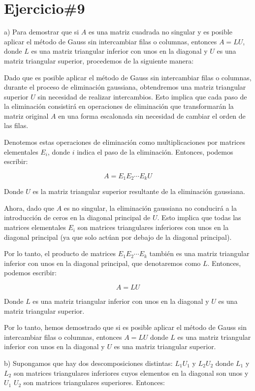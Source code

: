 \documentclass[a4paper,12pt]{article}
\begin{document}
\section*{Ejercicio\#9}

a)
Para demostrar que si \( A \) es una matriz cuadrada no singular y es posible aplicar el método de Gauss sin intercambiar filas o columnas, entonces \( A = LU \), donde \( L \) es una matriz triangular inferior con unos en la diagonal y \( U \) es una matriz triangular superior, procedemos de la siguiente manera:

Dado que es posible aplicar el método de Gauss sin intercambiar filas o columnas, durante el proceso de eliminación gaussiana, obtendremos una matriz triangular superior \( U \) sin necesidad de realizar intercambios. Esto implica que cada paso de la eliminación consistirá en operaciones de eliminación que transformarán la matriz original \( A \) en una forma escalonada sin necesidad de cambiar el orden de las filas.

Denotemos estas operaciones de eliminación como multiplicaciones por matrices elementales \( E_i \), donde \( i \) indica el paso de la eliminación. Entonces, podemos escribir:

\[ A = E_1 E_2 \cdots E_k U \]

Donde \( U \) es la matriz triangular superior resultante de la eliminación gaussiana.

Ahora, dado que \( A \) es no singular, la eliminación gaussiana no conducirá a la introducción de ceros en la diagonal principal de \( U \). Esto implica que todas las matrices elementales \( E_i \) son matrices triangulares inferiores con unos en la diagonal principal (ya que solo actúan por debajo de la diagonal principal).

Por lo tanto, el producto de matrices \( E_1 E_2 \cdots E_k \) también es una matriz triangular inferior con unos en la diagonal principal, que denotaremos como \( L \). Entonces, podemos escribir:

\[ A = L U \]

Donde \( L \) es una matriz triangular inferior con unos en la diagonal y \( U \) es una matriz triangular superior.

Por lo tanto, hemos demostrado que si es posible aplicar el método de Gauss sin intercambiar filas o columnas, entonces \( A = LU \) donde \( L \) es una matriz triangular inferior con unos en la diagonal y \( U \) es una matriz triangular superior.

b) Supongamos que hay dos descomposiciones distintas:
$L_1 U_1$ y $L_2 U_2$ donde $L_1$ y $L_2$ son matrices triangulares inferiores cuyos elementos en la diagonal son unos y $U_1$ $U_2$ son matrices triangulares superiores. Entonces:
\end{document}
